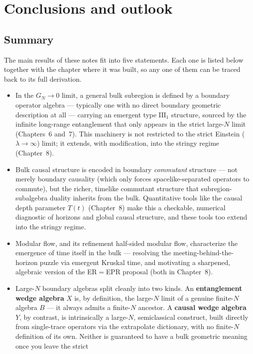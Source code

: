 \chapter{Conclusions and outlook}

\section{Summary}

The main results of these notes fit into five statements. Each one is listed below together with the chapter
where it was built, so any one of them can be traced back to its full derivation.

\begin{itemize}
\item In the $G_N\to0$ limit, a general bulk subregion is defined by a boundary operator algebra —
typically one with no direct boundary geometric description at all — carrying an emergent type
$\mathrm{III}_1$ structure, sourced by the infinite long-range entanglement that only appears in the strict
large-$N$ limit (Chapters~6 and~7). This machinery is not restricted to the strict Einstein
($\lambda\to\infty$) limit; it extends, with modification, into the stringy regime (Chapter~8).
\item Bulk causal structure is encoded in boundary \emph{commutant} structure — not merely boundary
causality (which only forces spacelike-separated operators to commute), but the richer, timelike commutant
structure that subregion-subalgebra duality inherits from the bulk. Quantitative tools like the causal depth
parameter $T(t)$ (Chapter~8) make this a checkable, numerical diagnostic of horizons and global causal
structure, and these tools too extend into the stringy regime.
\item Modular flow, and its refinement half-sided modular flow, characterize the emergence of time itself in
the bulk — resolving the meeting-behind-the-horizon puzzle via emergent Kruskal time, and motivating a
sharpened, algebraic version of the ER$=$EPR proposal (both in Chapter~8).
\item Large-$N$ boundary algebras split cleanly into two kinds. An \textbf{entanglement wedge algebra} $X$ is,
by definition, the large-$N$ limit of a genuine finite-$N$ algebra $B$ — it always admits a finite-$N$
ancestor. A \textbf{causal wedge algebra} $Y$, by contrast, is intrinsically a large-$N$, semiclassical
construct, built directly from single-trace operators via the extrapolate dictionary, with no finite-$N$
definition of its own. Neither is guaranteed to have a bulk geometric meaning once you leave the strict

\end{itemize}
